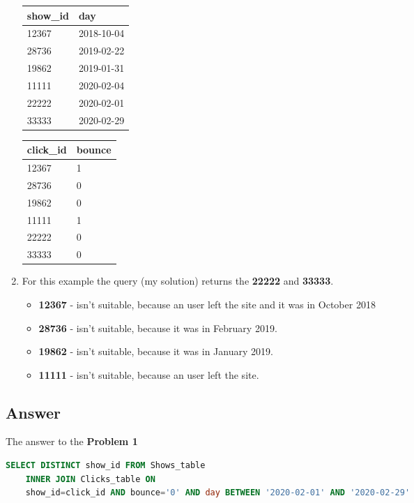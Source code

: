 \documentclass[14pt, a4paper]{extarticle}
\begin{document}
\begin{enumerate}
\begin{minipage}{.3\linewidth}
    \begin{tabular}{|l|l|}
    \hline
    show\_id & day        \\ \hline
    12367    & 2018-10-04 \\ \hline
    28736    & 2019-02-22 \\ \hline
    19862    & 2019-01-31 \\ \hline
    11111    & 2020-02-04 \\ \hline
    22222    & 2020-02-01 \\ \hline
    33333    & 2020-02-29 \\ \hline
    \end{tabular}
\end{minipage}
\begin{minipage}{.3\linewidth}
    \begin{tabular}{|l|l|}
        \hline
        click\_id & bounce \\ \hline
        12367     & 1      \\ \hline
        28736     & 0      \\ \hline
        19862     & 0      \\ \hline
        11111     & 1      \\ \hline
        22222     & 0      \\ \hline
        33333     & 0      \\ \hline
    \end{tabular}
\end{minipage}

\item For this example the query (my solution) returns the \textbf{22222} and \textbf{33333}.
\begin{itemize}
    \item \textbf{12367} - isn't suitable, because an user left the site and it was in October 2018
    \item \textbf{28736} - isn't suitable, because it was in February 2019.
    \item \textbf{19862} - isn't suitable, because it was in January 2019.
    \item \textbf{11111} - isn't suitable, because an user left the site.
\end{itemize}
\end{enumerate}

\subsection*{Answer}
The answer to the \textbf{Problem 1}
\begin{lstlisting}[language=SQL]
    SELECT DISTINCT show_id FROM Shows_table
    INNER JOIN Clicks_table ON
    show_id=click_id AND bounce='0' AND day BETWEEN '2020-02-01' AND '2020-02-29'
\end{lstlisting}
\end{document}
